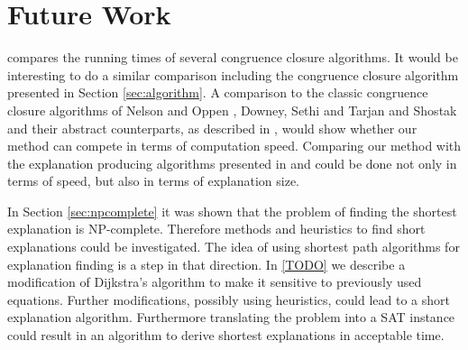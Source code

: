 \section*{Future Work}

\cite{Bachmair2000} compares the running times of several congruence closure algorithms.
It would be interesting to do a similar comparison including the congruence closure algorithm presented in Section \ref{sec:algorithm}.
A comparison to the classic congruence closure algorithms of Nelson and Oppen \cite{Nelson1980}, Downey, Sethi and Tarjan \cite{Downey1980} and Shostak \cite{Shostak1978} and their abstract counterparts, as described in \cite{Bachmair2000}, would show whether our method can compete in terms of computation speed.
Comparing our method with the explanation producing algorithms presented in \cite{Fontaine2004} and \cite{Nieuwenhuis2005,Nieuwenhuis2007} could be done not only in terms of speed, but also in terms of explanation size.

In Section \ref{sec:npcomplete} it was shown that the problem of finding the shortest explanation is NP-complete.
Therefore methods and heuristics to find short explanations could be investigated.
The idea of using shortest path algorithms for explanation finding is a step in that direction.
In \ref{TODO} we describe a modification of Dijkstra's algorithm \cite{TODO} to make it sensitive to previously used equations.
Further modifications, possibly using heuristics, could lead to a short explanation algorithm.
Furthermore translating the problem into a SAT instance could result in an algorithm to derive shortest explanations in acceptable time.
